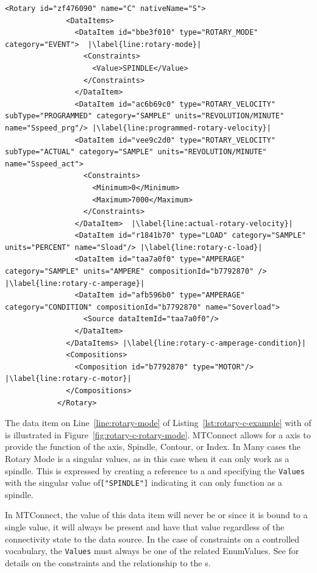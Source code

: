 \begin{lstlisting}[firstnumber=last,%
    caption={Rotary C Axis},label={lst:rotary-c-example},escapechar=|]
            <Rotary id="zf476090" name="C" nativeName="S">
              <DataItems>
                <DataItem id="bbe3f010" type="ROTARY_MODE" category="EVENT">  |\label{line:rotary-mode}|
                  <Constraints>
                    <Value>SPINDLE</Value>
                  </Constraints>
                </DataItem>
                <DataItem id="ac6b69c0" type="ROTARY_VELOCITY" subType="PROGRAMMED" category="SAMPLE" units="REVOLUTION/MINUTE" name="Sspeed_prg"/> |\label{line:programmed-rotary-velocity}|
                <DataItem id="vee9c2d0" type="ROTARY_VELOCITY" subType="ACTUAL" category="SAMPLE" units="REVOLUTION/MINUTE" name="Sspeed_act"> 
                  <Constraints>
                    <Minimum>0</Minimum>
                    <Maximum>7000</Maximum>
                  </Constraints>
                </DataItem>  |\label{line:actual-rotary-velocity}|
                <DataItem id="r1841b70" type="LOAD" category="SAMPLE" units="PERCENT" name="Sload"/> |\label{line:rotary-c-load}|
                <DataItem id="taa7a0f0" type="AMPERAGE" category="SAMPLE" units="AMPERE" compositionId="b7792870" /> |\label{line:rotary-c-amperage}|
                <DataItem id="afb596b0" type="AMPERAGE" category="CONDITION" compositionId="b7792870" name="Soverload">
                  <Source dataItemId="taa7a0f0"/>
                </DataItem>
              </DataItems> |\label{line:rotary-c-amperage-condition}|
              <Compositions>
                <Composition id="b7792870" type="MOTOR"/> |\label{line:rotary-c-motor}|
              </Compositions>
            </Rotary>
\end{lstlisting}

The data item on Line~\ref{line:rotary-mode} of Listing~\ref{lst:rotary-c-example} with  of  is illustrated in Figure~\ref{fig:rotary-c-rotary-mode}. MTConnect allows for a  axis to provide the function of the axis, Spindle, Contour, or Index. In Many cases the Rotary Mode is a singular values, as in this case when it can only work as a spindle. This is expressed by creating a  reference to a   and specifying the \texttt{Values}   with the singular value of\texttt{["SPINDLE"]} indicating it can only function as a spindle. 

In MTConnect, the value of this data item will never be  or  since it is bound to a single value, it will always be present and have that value regardless of the connectivity state to the data source. In the case of constraints on a controlled vocabulary, the \texttt{Values} must always be one of the related EnumValues. See \cite{MTCPart2} for details on the constraints and the relationship to the s.

